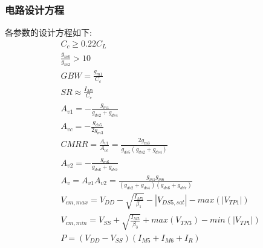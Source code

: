     \subsubsection{电路设计方程}
    各参数的设计方程如下:
    \begin{align}
        & C_c \geq 0.22C_L \\
        & \frac{g_{m6}}{g_{m2}} > 10 \\
        & GBW = \frac{g_{m1}}{C_c} \\
        & SR \approx \frac{I_{M5}}{C_c} \\
        & A_{v1} = -\frac{g_{m1}}{g_{ds2}+g_{ds4}} \\
        & A_{vc} = -\frac{g_{ds5}}{2g_{m3}} \\
        & CMRR = \frac{A_{v1}}{A_{vc}} = \frac{2g_{m3}}{g_{ds5}(g_{ds2}+g_{ds4})} \\
        & A_{v2} = -\frac{g_{m6}}{g_{ds6}+g_{ds7}} \\
        & A_v = A_{v1}A_{v2} = \frac{g_{m1}g_{m6}}{(g_{ds2}+g_{ds4})(g_{ds6}+g_{ds7})} \\
        & V_{cm,max} = V_{DD} - \sqrt{\frac{I_{M5}}{\beta_1}} - |V_{DS5,sat}| - max(|V_{TP1}|) \\
        & V_{cm,min} = V_{SS} + \sqrt{\frac{I_{M5}}{\beta_3}} + max(V_{TN3}) - min(|V_{TP1}|) \\
        & P=(V_{DD}-V_{SS})(I_{M5}+I_{M6}+I_R)
    \end{align}

